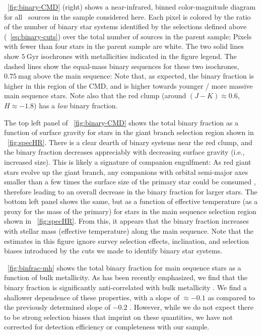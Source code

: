 \documentclass[modern]{aastex63}
\begin{document}
\figurename~\ref{fig:binary-CMD} (right) shows a near-infrared, binned
color-magnitude diagram for all \apogee\ sources in the sample considered here.
Each pixel is colored by the ratio of the number of binary star systems
identified by the selections defined above (\equationname~\ref{eq:binary-cuts})
over the total number of sources in the parent sample; Pixels with fewer than
four stars in the parent sample are white.
The two solid lines show $5~\mathrm{Gyr}$  isochrones
\cite{Dotter:2016, Choi:2016, Paxton:2011, Paxton:2013, Paxton:2015} with
metallicities indicated in the figure legend.
The dashed lines show the equal-mass binary sequences for these two isochrones,
$0.75~\mathrm{mag}$ above the main sequence: Note that, as expected, the binary
fraction is higher in this region of the CMD, and is higher towards younger /
more massive main sequence stars.
Note also that the red clump (around $(J-K) \approx 0.6$, $H \approx -1.8$) has
a \emph{low} binary fraction.

The top left panel of \figurename~\ref{fig:binary-CMD} shows the total binary
fraction as a function of surface gravity for stars in the giant branch
selection region shown in \figurename~\ref{fig:specHR}.
There is a clear dearth of binary systems near the red clump, and the binary
fraction decreases appreciably with decreasing surface gravity (i.e., increased
size).
This is likely a signature of companion engulfment: As red giant stars evolve
up the giant branch, any companions with orbital semi-major axes smaller than a
few times the surface size of the primary star could be consumed \citep{TODO},
therefore leading to an overall decrease in the binary fraction for larger
stars.
The bottom left panel shows the same, but as a function of effective temperature
(as a proxy for the mass of the primary) for stars in the main sequence
selection region shown in \figurename~\ref{fig:specHR}.
From this, it appears that the binary fraction increases with stellar mass
(effective temperature) along the main sequence.
Note that the estimates in this figure ignore survey selection effects,
inclination, and selection biases introduced by the cuts we made to identify
binary star systems.

\figurename~\ref{fig:binfrac-mh} shows the total binary fraction for main
sequence stars as a function of bulk metallicity.
As has been recently emphasized, we find that the binary fraction is
significantly anti-correlated with bulk metallicity \citep[e.g.,][]{Moe:2019}.
We find a shallower dependence of these properties, with a slope of $\approx
-0.1$ as compared to the previously determined slope of $-0.2$ \citep{Moe:2019}.
However, while we do not expect there to be strong selection biases that imprint
on these quantities, we have not corrected for detection efficiency or
completeness with our sample.
\end{document}
